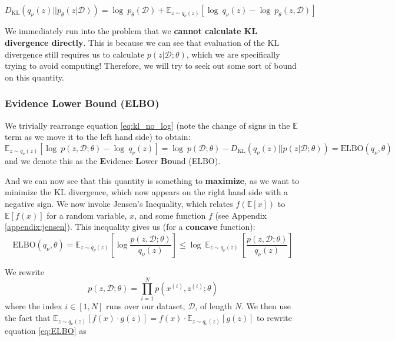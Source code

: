 \documentclass[]{article}
\begin{document}
\begin{equation}\label{eq:kl_no_log}
    D_\text{KL}(q_\nu(z) || p_\theta(z|\mathcal{D})) = \log~p_\theta(\mathcal{D}) + \mathbb{E}_{z \sim q_\nu(z)}\left[\log~q_\nu(z) - \log~p_\theta(z, \mathcal{D}) \right]
\end{equation}

We immediately run into the problem that we \textbf{cannot calculate KL divergence directly}. This is because we can see that evaluation of the KL divergence still requires us to calculate $p(z|\mathcal{D};\theta)$, which we are specifically trying to avoid computing! Therefore, we will try to seek out some sort of bound on this quantity.

\subsubsection{Evidence Lower Bound (ELBO)}

We trivially rearrange equation \ref{eq:kl_no_log} (note the change of signs in the $\mathbb{E}$ term as we move it to the left hand side) to obtain:
\begin{equation}
    \mathbb{E}_{z\sim{q_\nu(z)}}\left[\log~p(z, \mathcal{D};\theta) - \log~q_\nu (z) \right] = \log~p(\mathcal{D};\theta) - D_\text{KL}(q_\nu (z) ||p(z|\mathcal{D};\theta)) = \text{ELBO}(q_\nu, \theta)
\end{equation}
and we denote this as the \textbf{E}vidence \textbf{L}ower \textbf{Bo}und (ELBO).

And we can now see that this quantity is something to \textbf{maximize}, as we want to minimize the KL divergence, which now appears on the right hand side with a negative sign. We now invoke Jensen's Inequality, which relates $f(\mathbb{E}[x])$ to $\mathbb{E}[f(x)]$ for a random variable, $x$, and some function $f$ (see Appendix \ref{appendix:jensen}). This inequality gives us (for a \textbf{concave} function):
\begin{equation}\label{eq:ELBO}
    \text{ELBO}(q_\nu, \theta) 
    = 
    \mathbb{E}_{z \sim q_\nu (z)}\left[\log\frac{p(z, \mathcal{D};\theta)}{q_\nu (z)}\right] 
    \leq 
    \log~\mathbb{E}_{z \sim q_\nu (z)}~\left[\frac{p(z, \mathcal{D};\theta)}{q_\nu (z)}\right]
\end{equation}

We rewrite 
\begin{equation}
    p(z, \mathcal{D};\theta) = \prod_{i=1}^N p(x^{(i)}, z^{(i)};\theta)
\end{equation}
where the index $i \in [1, N]$ runs over our dataset, $\mathcal{D}$, of length $N$. We then use the fact that $\mathbb{E}_{z \sim q_\nu (z)}\left[f(x)\cdot g(z)\right] = f(x)\cdot\mathbb{E}_{z \sim q_\nu (z)} \left[g(z)\right]$ to rewrite equation \ref{eq:ELBO} as
\end{document}
